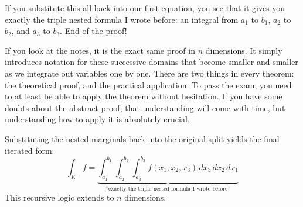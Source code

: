 \begin{spoken-clean}[28:00 - 30:00]
If you substitute this all back into our first equation, you see that it gives you exactly the triple nested formula I wrote before: an integral from $a_1$ to $b_1$, $a_2$ to $b_2$, and $a_3$ to $b_3$. End of the proof! 

If you look at the notes, it is the exact same proof in $n$ dimensions. It simply introduces notation for these successive domains that become smaller and smaller as we integrate out variables one by one. There are two things in every theorem: the theoretical proof, and the practical application. To pass the exam, you need to at least be able to apply the theorem without hesitation. If you have some doubts about the abstract proof, that understanding will come with time, but understanding how to apply it is absolutely crucial.
\end{spoken-clean}

\begin{nice-box}
\begin{theorem}
Substituting the nested marginals back into the original split yields the final iterated form:
\[
\int_K f = \underbrace{\int_{a_1}^{b_1} \int_{a_2}^{b_2} \int_{a_3}^{b_3} f(x_1, x_2, x_3) \, dx_3 \, dx_2 \, dx_1}_{\text{``exactly the triple nested formula I wrote before''}}
\]
This recursive logic extends to $n$ dimensions.
\end{theorem}
\end{nice-box}